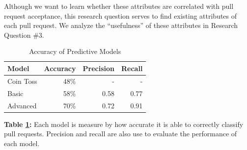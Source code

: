 \documentclass[10pt, conference]{IEEEtran}
\begin{document}
Although we want to learn whether these attributes are correlated with pull request acceptance, this research question serves to find existing attributes of each pull request. We analyze the \enquote{usefulness} of these attributes in Research Question \#3.
\begin{table}[h!]
  \centering
  \caption{Accuracy of Predictive Models}
  \label{figurePredictionModels}
  \begin{tabular}{lrrr}
    \toprule
    \textbf {Model} & \textbf{Accuracy} & \textbf{Precision} & \textbf{Recall}\\ %
    \midrule
    Coin Toss & 48\% & - & - \\ %
    Basic & 58\% & 0.58 & 0.77\\ %
    Advanced & 70\% & 0.72 & 0.91\\ %
    \bottomrule
  \end{tabular}
  \break
  \break
\textbf{Table \ref{figurePredictionModels}:} Each model is measure by how accurate it is able to correctly classify pull requests. Precision and recall are also use to evaluate the performance of each model.
\end{table}
\end{document}
